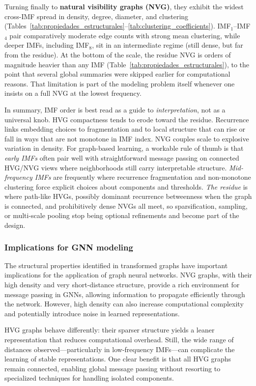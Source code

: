 \documentclass[11pt,a4paper]{article}
\begin{document}
Turning finally to \textbf{natural visibility graphs (NVG)}, they exhibit the widest cross-IMF spread in density, degree, diameter, and clustering (Tables~\ref{tab:propiedades_estructurales}--\ref{tab:clustering_coefficients}). IMF$_1$--IMF$_4$ pair comparatively moderate edge counts with strong mean clustering, while deeper IMFs, including IMF$_8$, sit in an intermediate regime (still dense, but far from the residue). At the bottom of the scale, the residue NVG is orders of magnitude heavier than any IMF (Table~\ref{tab:propiedades_estructurales}), to the point that several global summaries were skipped earlier for computational reasons. That limitation is part of the modeling problem itself whenever one insists on a full NVG at the lowest frequency.

In summary, IMF order is best read as a guide to \emph{interpretation}, not as a universal knob. HVG compactness tends to erode toward the residue. Recurrence links embedding choices to fragmentation and to local structure that can rise or fall in ways that are not monotone in IMF index. NVG couples scale to explosive variation in density. For graph-based learning, a workable rule of thumb is that \emph{early IMFs} often pair well with straightforward message passing on connected HVG/NVG views where neighborhoods still carry interpretable structure. \emph{Mid-frequency IMFs} are frequently where recurrence fragmentation and non-monotone clustering force explicit choices about components and thresholds. \emph{The residue} is where path-like HVGs, possibly dominant recurrence betweenness when the graph is connected, and prohibitively dense NVGs all meet, so sparsification, sampling, or multi-scale pooling stop being optional refinements and become part of the design.

\subsubsection{Implications for GNN modeling}

The structural properties identified in transformed graphs have important implications for the application of graph neural networks. NVG graphs, with their high density and very short-distance structure, provide a rich environment for message passing in GNNs, allowing information to propagate efficiently through the network. However, high density can also increase computational complexity and potentially introduce noise in learned representations.

HVG graphs behave differently: their sparser structure yields a leaner representation that reduces computational overhead. Still, the wide range of distances observed—particularly in low-frequency IMFs—can complicate the learning of stable representations. One clear benefit is that all HVG graphs remain connected, enabling global message passing without resorting to specialized techniques for handling isolated components.
\end{document}
